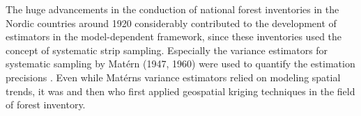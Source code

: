 The huge advancements in the conduction of national forest inventories in the Nordic countries around 1920 considerably contributed to the development of estimators in the model-dependent framework, since these inventories used the concept of systematic strip sampling. Especially the variance estimators for systematic sampling by Mat\'{e}rn (1947, 1960) were used to quantify the estimation precisions \citep{kangas2006}. Even while Mat\'{e}rns variance estimators relied on modeling spatial trends, it was \citet{houllier1987} and then \citet{mandallaz1993} who first applied geospatial kriging techniques in the field of forest inventory.\par




